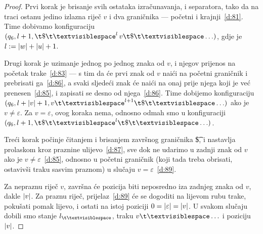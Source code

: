 \begin{proof}
Prvi korak je brisanje svih ostataka izračunavanja, i separatora, tako da na traci ostanu jedino izlazna riječ $v$ i dva graničnika --- početni i krajnji~\eqref{d:81}. Time dobivamo konfiguraciju $(q_6,l+1,\t\$\bl^l\,v\t\$\bl\ldots)$, gdje je $l:=\lvert w\rvert+\lvert u\rvert+1$.

Drugi korak je uzimanje jednog po jednog znaka od $v$, i njegov prijenos na početak trake~\eqref{d:83} --- s tim da će prvi znak od $v$ naići na početni graničnik i prebrisati ga~\eqref{d:86}, a svaki sljedeći znak će naići na onaj prije njega koji je već prenesen~\eqref{d:85}, i zapisati se desno od njega~\eqref{d:86}. Time dobijemo konfiguraciju $(q_6,l+\dulj v+1,v\bl^{l+1}\t\$\bl\ldots)$ ako je $v\ne\varepsilon$. Za $v=\varepsilon$, ovog koraka nema, odnosno odmah smo u konfiguraciji $(q_6,l+1,\t\$\bl^l\t\$\bl\ldots)$.

Treći korak počinje čitanjem i brisanjem završnog graničnika \t\$, i nastavlja prolaskom kroz praznine ulijevo~\eqref{d:87}, sve dok ne udarimo u zadnji znak od $v$ ako je $v\ne\varepsilon$~\eqref{d:85}, odnosno u početni graničnik (koji tada treba obrisati, ostavivši traku sasvim praznom) u slučaju $v=\varepsilon$~\eqref{d:89}.

Za nepraznu riječ $v$, završna će pozicija biti neposredno iza zadnjeg znaka od $v$, dakle $\lvert v\rvert$. Za praznu riječ, prijelaz~\eqref{d:89} će se dogoditi na lijevom rubu trake, pokušati pomak lijevo, i ostati na istoj poziciji $0=\lvert\varepsilon\rvert=\lvert v\rvert$. U svakom slučaju dobili smo stanje $l_{\bl}$, traku $v\bl\ldots$ i poziciju $\lvert v\rvert$.
\end{proof}

